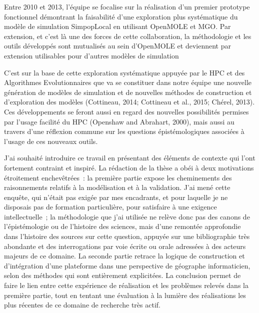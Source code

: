 Entre 2010 et 2013, l'équipe se focalise sur la réalisation d'un premier prototype fonctionnel démontrant la faisabilité d'une exploration plus systématique du modèle de simulation SimpopLocal en utilisant OpenMOLE et MGO. Par extension, et c'est là une des forces de cette collaboration, la méthodologie et les outils développés sont mutualisés au sein d'OpenMOLE et deviennent par extension utilisables pour d'autres modèles de simulation \autocites{Schmitt2014, Reuillon2015} 
 
C'est sur la base de cette exploration systématique appuyée par le HPC et des Algorithmes Evolutionnaires que va se constituer dans notre équipe une nouvelle génération de modèles de simulation et de nouvelles méthodes de construction et d'exploration des modèles (Cottineau, 2014; Cottineau et al., 2015; Chérel, 2013)⁠.  Ces développements se feront aussi en regard des nouvelles possibilités permises par l'usage facilité du HPC (Openshaw and Abrahart, 2000)⁠, mais aussi au travers d'une réflexion commune sur les questions épistémologiques associées à l'usage de ces nouveaux outils. 

J’ai souhaité introduire ce travail en présentant des éléments de contexte qui l’ont fortement contraint et inspiré. La rédaction de la thèse a obéi à deux motivations étroitement enchevêtrées : la première partie expose les cheminements des raisonnements relatifs à la modélisation et à la validation. J’ai mené cette enquête, qui n’était pas exigée par mes encadrants, et pour laquelle je ne disposais pas de formation particulière, pour satisfaire à une exigence intellectuelle ; la méthodologie que j’ai utilisée ne relève donc pas des canons de l’épistémologie ou de l’histoire des sciences, mais d’une remontée approfondie dans l’histoire des sources sur cette question, appuyée sur une bibliographie très abondante et des interrogations par voie écrite ou orale adressées à des acteurs majeurs de ce domaine. La seconde partie retrace la logique de construction et d’intégration d’une plateforme dans une perspective de géographe informaticien, selon des méthodes qui sont entièrement explicitées. La conclusion permet de faire le lien entre cette expérience de réalisation et les problèmes relevés dans la première partie, tout en tentant une évaluation à la lumière des réalisations les plus récentes de ce domaine de recherche très actif. 